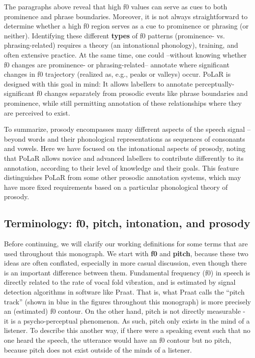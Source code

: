 \documentclass[11pt, twoside]{memoir}
\begin{document}
The paragraphs above reveal that high f0 values can serve as cues to both prominence and phrase boundaries. Moreover, it is not always straightforward to determine whether a high f0 region serves as a cue to prominence or phrasing (or neither). Identifying these different \textbf{types} of f0 patterns (prominence- vs. phrasing-related) requires a theory (an intonational phonology), training, and often extensive practice. At the same time, one could --without knowing whether f0 changes are prominence- or phrasing-related-- annotate where significant changes in f0 trajectory (realized as, e.g., peaks or valleys) occur. PoLaR is designed with this goal in mind: It allows labellers to annotate perceptually-significant f0 changes separately from prosodic events like phrase boundaries and prominence, while still permitting annotation of these relationships where they are perceived to exist.

To summarize, prosody encompasses many different aspects of the speech signal -- beyond words and their phonological representations as sequences of consonants and vowels. Here we have focused on the intonational aspects of prosody, noting that PoLaR allows novice and advanced labellers to contribute differently to its annotation, according to their level of knowledge and their goals. This feature distinguishes PoLaR from some other prosodic annotation systems, which may have more fixed requirements based on a particular phonological theory of prosody.

\subsection{Terminology: f0, pitch, intonation, and prosody}\label{sec:terminology}

Before continuing, we will clarify our working definitions for some terms that are used throughout this monograph. We start with \textbf{f0} and \textbf{pitch}, because these two ideas are often conflated, especially in more casual discussion, even though there is an important difference between them. Fundamental frequency (f0) in speech is directly related to the rate of vocal fold vibration, and is estimated by signal detection algorithms in software like Praat. That is, what Praat calls the “pitch track” (shown in blue in the figures throughout this monograph) is more precisely an (estimated) f0 contour. On the other hand, pitch is not directly measurable - it is a psycho-perceptual phenomenon. As such, pitch only exists in the mind of a listener. To describe this another way, if there were a speaking event such that no one heard the speech, the utterance would have an f0 contour but no pitch, because pitch does not exist outside of the minds of a listener.
\end{document}
